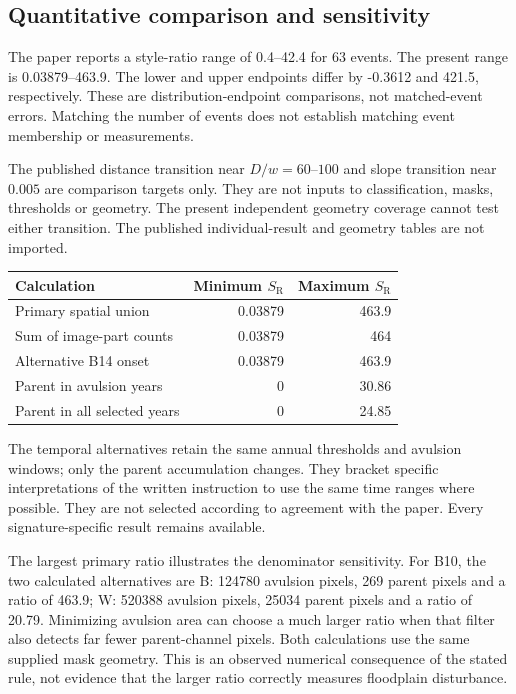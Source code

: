 \subsection{Quantitative comparison and sensitivity}

The paper reports a style-ratio range of 0.4--42.4 for 63 events. The present range is 0.03879--463.9. The lower and upper endpoints differ by -0.3612 and 421.5, respectively. These are distribution-endpoint comparisons, not matched-event errors. Matching the number of events does not establish matching event membership or measurements.

The published distance transition near $D/w=60$--$100$ and slope transition near $0.005$ are comparison targets only. They are not inputs to classification, masks, thresholds or geometry. The present independent geometry coverage cannot test either transition. The published individual-result and geometry tables are not imported.

\begin{center}\begin{tabular}{lrr}\toprule Calculation & Minimum $S_{\mathrm R}$ & Maximum $S_{\mathrm R}$\\\midrule

Primary spatial union & 0.03879 & 463.9\\

Sum of image-part counts & 0.03879 & 464\\

Alternative B14 onset & 0.03879 & 463.9\\

Parent in avulsion years & 0 & 30.86\\

Parent in all selected years & 0 & 24.85\\

\bottomrule\end{tabular}\end{center}

The temporal alternatives retain the same annual thresholds and avulsion windows; only the parent accumulation changes. They bracket specific interpretations of the written instruction to use the same time ranges where possible. They are not selected according to agreement with the paper. Every signature-specific result remains available.

The largest primary ratio illustrates the denominator sensitivity. For B10, the two calculated alternatives are B: 124780 avulsion pixels, 269 parent pixels and a ratio of 463.9; W: 520388 avulsion pixels, 25034 parent pixels and a ratio of 20.79. Minimizing avulsion area can choose a much larger ratio when that filter also detects far fewer parent-channel pixels. Both calculations use the same supplied mask geometry. This is an observed numerical consequence of the stated rule, not evidence that the larger ratio correctly measures floodplain disturbance.

